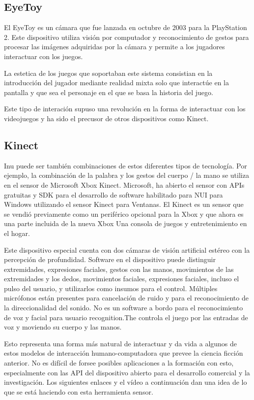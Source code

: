 \subsection{EyeToy}
El EyeToy es un cámara que fue lanzada en octubre de 2003 para la PlayStation 2. Este dispositivo utiliza visión por computador y reconocimiento de gestos para procesar las imágenes adquiridas por la cámara y permite a los jugadores interactuar con los juegos.

La estetica de los juegos que soportaban este sistema consistian en la introducción del jugador mediante realidad mixta  solo que interactúe en la pantalla y que sea el personaje en el que se basa la historia del juego. 

Este tipo de interación supuso una revolución en la forma de interactuar con los videojuegos y ha sido el precusor de otros dispositivos como Kinect.

\subsection{Kinect}
Inu puede ser también combinaciones de estos diferentes tipos de tecnología. Por ejemplo, la combinación de la palabra y los gestos del cuerpo / la mano se utiliza en el sensor de Microsoft Xbox Kinect. Microsoft, ha abierto el sensor con APIs gratuitas y SDK para el desarrollo de software habilitado para NUI para Windows utilizando el sensor Kinect para Ventanas. El Kinect es un sensor que se vendió previamente como un periférico opcional para la Xbox y que ahora es una parte incluida de la nueva Xbox Una consola de juegos y entretenimiento en el hogar.

Este dispositivo especial cuenta con dos cámaras de visión artificial estéreo con la percepción de profundidad. Software en el dispositivo puede distinguir extremidades, expresiones faciales, gestos con las manos, movimientos de las extremidades y los dedos, movimientos faciales, expresiones faciales, incluso el pulso del usuario, y utilizarlos como insumos para el control. Múltiples micrófonos están presentes para cancelación de ruido y para el reconocimiento de la direccionalidad del sonido. No es un software a bordo para el reconocimiento de voz y facial para usuario recognition.The controla el juego por las entradas de voz y moviendo su cuerpo y las manos.

Esto representa una forma más natural de interactuar y da vida a algunos de estos modelos de interacción humano-computadora que prevee la ciencia ficción anterior. No es difícil de forsee posibles aplicaciones a la formación con esto, especialmente con las API del dispositivo abierto para el desarrollo comercial y la investigación. Los siguientes enlaces y el vídeo a continuación dan una idea de lo que se está haciendo con esta herramienta sensor.

